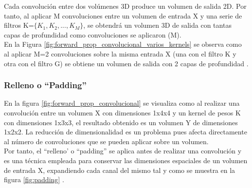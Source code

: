 Cada convolución entre dos volúmenes 3D produce un volumen de salida 2D. Por tanto, al aplicar M convoluciones entre un volumen de entrada X y una serie de filtros K=$\{K_1, K_2, ..., K_M\}$, se obtendrá un volumen 3D de salida con tantas capas de profundidad como convoluciones se aplicaron (M). \\
En la Figura \ref{fig:forward_prop_convolucional_varios_kernels} se observa como al aplicar M=2 convoluciones sobre la misma entrada X (una con el filtro K y otra con el filtro G) se obtiene un volumen de salida con 2 capas de profundidad \cite{capa_convolucional_Stanford}.

\subsubsection{Relleno o ``Padding''}

En la figura \ref{fig:forward_prop_convolucional} se visualiza como al realizar una convolución entre un volumen X con dimensiones 1x4x4 y un kernel de pesos K con dimensiones 1x3x3, el resultado obtenido es un volumen Y de dimensiones 1x2x2. La reducción de dimensionalidad es un problema pues afecta directamente al número de convoluciones que se pueden aplicar sobre un volumen. \\
Por tanto, el ``relleno' o ``padding'' \cite{padding_definicion} se aplica antes de realizar una convolución y es una técnica empleada para conservar las dimensiones espaciales de un volumen de entrada X, expandiendo cada canal del mismo tal y como se muestra en la figura \ref{fig:padding} \cite{padding_1}.

